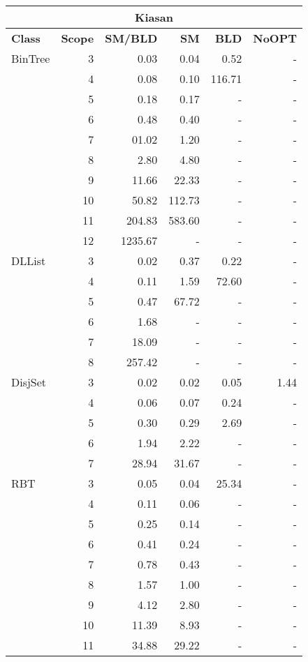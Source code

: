 \begin{table}[H]
\scriptsize
\centering
\label{tab:results-obj4}
\begin{tabular}{ l r | r | r | r | r  }
  \toprule
  \multicolumn{6}{c}{\textbf{Kiasan}} \\
  \midrule 
  \textbf{Class} & \textbf{Scope} & \textbf{SM/BLD} & \textbf{SM}  & \textbf{BLD} & \textbf{NoOPT}  \\
  \midrule
  BinTree
&	3	&	0.03	&	0.04	&	0.52	&	-	\\
&	4	&	0.08	&	0.10	&	116.71	&	-	\\
&	5	&	0.18	&	0.17	&	-	&	-	\\
&	6	&	0.48	&	0.40	&	-	&	-	\\
&	7	&	01.02	&	1.20	&	-	&	-	\\
&	8	&	2.80	&	4.80	&	-	&	-	\\
&	9	&	11.66	&	22.33	&	-	&	-	\\
&	10	&	50.82	&	112.73	&	-	&	-	\\
&	11	&	204.83	&	583.60	&	-	&	-	\\
&	12	&	1235.67	&	-	&	-	&	-	\\
  \midrule
  DLList
&	3	&	0.02	&	0.37	&	0.22	&	-	\\
&	4	&	0.11	&	1.59	&	72.60	&	-	\\
&	5	&	0.47	&	67.72	&	-	&	-	\\
&	6	&	1.68	&	-	&	-	&	-	\\
&	7	&	18.09	&	-	&	-	&	-	\\
&	8	&	257.42	&	-	&	-	&	-	\\
  \midrule
  DisjSet
&	3	&	0.02	&	0.02	&	0.05	&	1.44	\\
&	4	&	0.06	&	0.07	&	0.24	&	-	\\
&	5	&	0.30	&	0.29	&	2.69	&	-	\\
&	6	&	1.94	&	2.22	&	-	&	-	\\
&	7	&	28.94	&	31.67	&	-	&	-	\\
  \midrule
  RBT
&	3	&	0.05	&	0.04	&	25.34	&	-	\\
&	4	&	0.11	&	0.06	&	-	&	-	\\
&	5	&	0.25	&	0.14	&	-	&	-	\\
&	6	&	0.41	&	0.24	&	-	&	-	\\
&	7	&	0.78	&	0.43	&	-	&	-	\\
&	8	&	1.57	&	1.00	&	-	&	-	\\
&	9	&	4.12	&	2.80	&	-	&	-	\\
&	10	&	11.39	&	8.93	&	-	&	-	\\
&	11	&	34.88	&	29.22	&	-	&	-	\\

\end{tabular}
\end{table}
